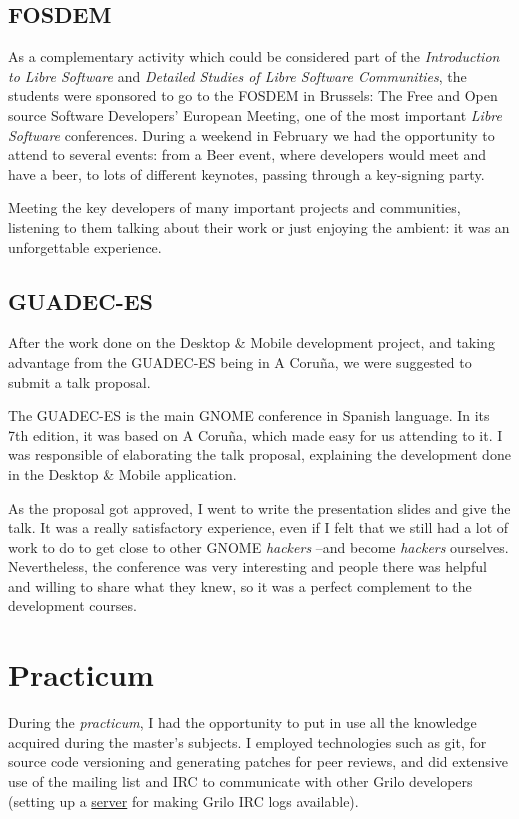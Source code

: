\subsection{FOSDEM}

As a complementary activity which could be considered part of the {\it Introduction
to Libre Software} and {\it Detailed Studies of Libre Software Communities}, the
students were sponsored to go to the FOSDEM in Brussels: The Free and Open source
Software Developers' European Meeting, one of the most important
{\it Libre Software} conferences. During a weekend in February we had the opportunity
to attend to several events: from a Beer event, where developers would meet and
have a beer, to lots of different keynotes, passing through a key-signing party.

Meeting the key developers of many important projects and communities, listening to
them talking about their work or just enjoying the ambient: it was an unforgettable
experience.

\subsection{GUADEC-ES}

After the work done on the Desktop \& Mobile development project, and taking
advantage from the GUADEC-ES being in A Coru\~na, we were suggested to submit
a talk proposal.

The GUADEC-ES is the main GNOME conference in Spanish language. In its 7th edition,
it was based on A Coru\~na, which made easy for us attending to it. I was responsible
of elaborating the talk proposal, explaining the development done in the Desktop \&
Mobile application.

As the proposal got approved, I went to write the presentation slides and give the
talk. It was a really satisfactory experience, even if I felt that we still had
a lot of work to do to get close to other GNOME {\it hackers} --and become {\it hackers}
ourselves. Nevertheless, the conference was very interesting and people there was
helpful and willing to share what they knew, so it was a perfect complement to the
development courses.

\section{Practicum}
During the {\it practicum}, I had the opportunity to put in use all the knowledge acquired
during the master's subjects. I employed technologies such as git, for source code
versioning and generating patches for peer reviews, and did extensive use of the
mailing list and IRC to communicate with other Grilo developers (setting up
a \href{http://simonpena.homedns.org/grilo-logs/}{server} for making Grilo IRC logs available). 

